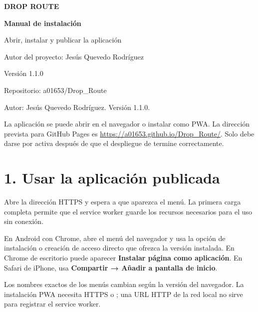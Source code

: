 \documentclass[a4paper,11pt]{article}
\let\originaltexttt\texttt
\renewcommand{\texttt}[1]{\originaltexttt{\seqsplit{#1}}}
\begin{document}
\begin{titlepage}
\thispagestyle{empty}
\pagecolor{navybg}
\color{white}
\vspace*{3cm}
\begin{center}
{\sffamily\bfseries\fontsize{16}{19}\selectfont\color{amber} DROP ROUTE\par}
\vspace{1.4cm}
{\sffamily\bfseries\fontsize{30}{38}\selectfont Manual de instalación\par}
\vspace{0.8cm}
{\sffamily\fontsize{14}{20}\selectfont\color{lightblue} Abrir, instalar y publicar la aplicación\par}
\vfill
{\sffamily\small Autor del proyecto: Jesús Quevedo Rodríguez\par}
{\sffamily\small Versión 1.1.0\par}
{\sffamily\small Repositorio: a01653/Drop\_Route\par}
\vspace{2cm}
\end{center}
\end{titlepage}
\nopagecolor
\restoregeometry
\setcounter{page}{2}
\tableofcontents
\newpage
Autor: Jesús Quevedo Rodríguez. Versión 1.1.0.

La aplicación se puede abrir en el navegador o instalar como PWA. La
dirección prevista para GitHub Pages es
\url{https://a01653.github.io/Drop_Route/}. Solo debe darse por activa
después de que el despliegue de \texttt{main} termine correctamente.

\section{1. Usar la aplicación
publicada}\label{1-usar-la-aplicaciuxf3n-publicada}

Abre la dirección HTTPS y espera a que aparezca el menú. La primera
carga completa permite que el service worker guarde los recursos
necesarios para el uso sin conexión.

En Android con Chrome, abre el menú del navegador y usa la opción de
instalación o creación de acceso directo que ofrezca la versión
instalada. En Chrome de escritorio puede aparecer \textbf{Instalar
página como aplicación}. En Safari de iPhone, usa \textbf{Compartir →
Añadir a pantalla de inicio}.

Los nombres exactos de los menús cambian según la versión del navegador.
La instalación PWA necesita HTTPS o \texttt{localhost}; una URL HTTP de
la red local no sirve para registrar el service worker.
\end{document}

